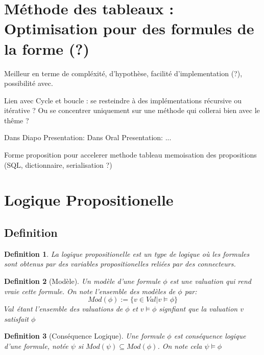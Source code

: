 \documentclass{paper}
\newtheorem{defi}{Definition}
\begin{document}
\setlength{\headheight}{13.07225pt}
\addtolength{\topmargin}{-1.07225pt}

\section*{Méthode des tableaux : Optimisation pour des formules de la forme (?)}
Meilleur en terme de compléxité, d'hypothèse, facilité d'implementation (?), possibilité avec.

Lien avec Cycle et boucle : se resteindre à des implémentations récursive ou itérative ? Ou se concentrer uniquement sur une méthode
qui collerai bien avec le thême ?

Dans Diapo Presentation:
Dans Oral Presentation: 
...


Forme proposition pour accelerer methode tableau
memoisation des propositions (SQL, dictionnaire, serialisation ?)

\tableofcontents

\section{Logique Propositionelle}
\subsection{Definition}
\begin{defi}
La \textit{logique propositionelle} est un type de logique où les formules sont obtenus par des variables propositionelles reliées par des connecteurs.
\end{defi}
\begin{defi}[Modèle]
    Un \textit{modèle} d'une formule $\phi$ est une valuation qui rend vraie cette formule. On note l'ensemble des modèles de $\phi$ par:
    $$Mod(\phi) := \{v\in Val | v \vDash \phi\}$$
    $Val$ étant l'ensemble des valuations de $\phi$ et $v \vDash \phi$ signfiant que la valuation $v$ satisfait $\phi$
\end{defi}
\begin{defi}[Conséquence Logique]
    Une formule $\phi$ est \textit{conséquence logique} d'une formule, notée $\psi$ si $Mod(\psi) \subseteq Mod(\phi)$. On note cela $\psi \vDash \phi$
\end{defi}
\end{document}

